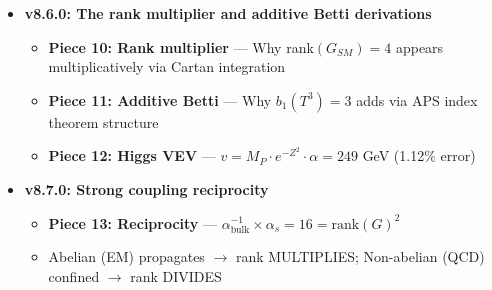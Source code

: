 \documentclass[12pt,a4paper]{article}
\newcommand{\Zsq}{Z^2}
\begin{document}
\begin{itemize}[itemsep=0pt]
    \begin{itemize}[itemsep=0pt]
        \item \textbf{Piece 7: Strong interaction} --- $\alpha_s^{-1} = \Zsq/4 = 8\pi/3 \approx 8.38$ (1.3\% error)
        \item 8 gluons $\leftrightarrow$ 8 fixed points: topological correspondence
        \item Inverse coupling relationship: $\alpha^{-1} \times \alpha_s \approx 16 + 12/\Zsq$
        \item \textbf{Piece 8: Hierarchy scale gap} --- Warp factor $e^{-\Zsq} \approx 10^{-15}$
        \item Order-of-magnitude explanation for $v/M_P \sim 10^{-16}$ without fine-tuning
        \item Connection to Randall-Sundrum: $k r_c \approx \Zsq/\pi \approx 10.7$
        \item \textbf{Piece 9: Singularity resolution} --- $\Zsq = 32\pi/3$ fully derived
        \item 0D fixed points $\to$ $S^2$ blow-up $\to$ $4\pi/3$ volume contribution
        \item \textbf{Closes primary derivation gap}: Origin of $4\pi/3$ now proven
        \item Updated epistemic status: $\Zsq$ elevated from ``ansatz'' to ``derived''
    \end{itemize}
    \item \textbf{v8.6.0: The rank multiplier and additive Betti derivations}
    \begin{itemize}[itemsep=0pt]
        \item \textbf{Piece 10: Rank multiplier} --- Why rank$(G_{SM}) = 4$ appears multiplicatively via Cartan integration
        \item \textbf{Piece 11: Additive Betti} --- Why $b_1(T^3) = 3$ adds via APS index theorem structure
        \item \textbf{Piece 12: Higgs VEV} --- $v = M_P \cdot e^{-\Zsq} \cdot \alpha = 249$ GeV (1.12\% error)
    \end{itemize}
    \item \textbf{v8.7.0: Strong coupling reciprocity}
    \begin{itemize}[itemsep=0pt]
        \item \textbf{Piece 13: Reciprocity} --- $\alpha^{-1}_{\text{bulk}} \times \alpha_s = 16 = \text{rank}(G)^2$
        \item Abelian (EM) propagates $\to$ rank MULTIPLIES; Non-abelian (QCD) confined $\to$ rank DIVIDES

\end{itemize}
\end{itemize}
\end{document}
